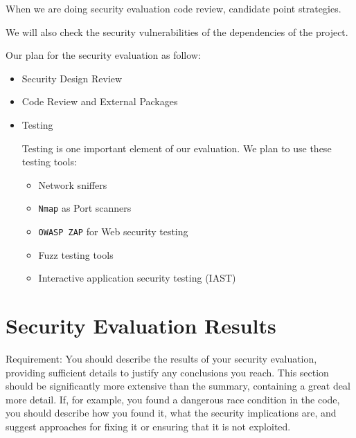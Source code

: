 \documentclass[12pt, a4paper]{article}
\newcommand{\code}[1]{\texttt{#1}}
\begin{document}
When we are doing security evaluation code review, candidate point strategies.

We will also check the security vulnerabilities of the dependencies of the project.

Our plan for the security evaluation as follow:
\begin{itemize}
    \item Security Design Review
    \item Code Review and External Packages
    \item Testing
    
Testing is one important element of our evaluation. We plan to use these testing tools:
\begin{itemize}
    \item Network sniffers
    \item \code{Nmap} as Port scanners
    \item \code{OWASP ZAP} for Web security testing 
    \item Fuzz testing tools
    \item Interactive application security testing (IAST)
\end{itemize}
\end{itemize}



\section{Security Evaluation Results}

Requirement: You should describe the results of your security evaluation, providing sufficient details to justify any conclusions you reach. This section should be significantly more extensive than the summary, containing a great deal more detail. If, for example, you found a dangerous race condition in the code, you should describe how you found it, what the security implications are, and suggest approaches for fixing it or ensuring that it is not exploited. 
\end{document}
